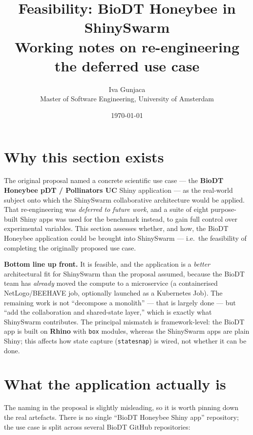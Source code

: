 \documentclass[12pt,a4paper]{article}
\title{\textbf{Feasibility: BioDT Honeybee in ShinySwarm}\\[0.5em]
\large Working notes on re-engineering the deferred use case}
\author{Iva Gunjaca\\
Master of Software Engineering, University of Amsterdam}
\date{\today}
\begin{document}
\maketitle

\section{Why this section exists}

The original proposal named a concrete scientific use case --- the
\textbf{BioDT Honeybee pDT / Pollinators UC} Shiny application --- as the
real-world subject onto which the ShinySwarm collaborative architecture would be
applied. That re-engineering was \emph{deferred to future work}, and a suite of
eight purpose-built Shiny apps was used for the benchmark instead, to gain full
control over experimental variables. This section assesses whether, and how, the
BioDT Honeybee application could be brought into ShinySwarm --- i.e.\ the
feasibility of completing the originally proposed use case.

\textbf{Bottom line up front.} It is feasible, and the application is a
\emph{better} architectural fit for ShinySwarm than the proposal assumed,
because the BioDT team has \emph{already} moved the compute to a microservice
(a containerised NetLogo/BEEHAVE job, optionally launched as a Kubernetes Job).
The remaining work is not ``decompose a monolith'' --- that is largely done ---
but ``add the collaboration and shared-state layer,'' which is exactly what
ShinySwarm contributes. The principal mismatch is framework-level: the BioDT app
is built on \textbf{Rhino} with \texttt{box} modules, whereas the ShinySwarm
apps are plain Shiny; this affects how state capture (\texttt{statesnap}) is
wired, not whether it can be done.

\section{What the application actually is}

The naming in the proposal is slightly misleading, so it is worth pinning down
the real artefacts. There is no single ``BioDT Honeybee Shiny app'' repository;
the use case is split across several BioDT GitHub repositories:
\end{document}
